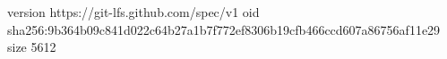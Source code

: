 version https://git-lfs.github.com/spec/v1
oid sha256:9b364b09c841d022c64b27a1b7f772ef8306b19cfb466ccd607a86756af11e29
size 5612
